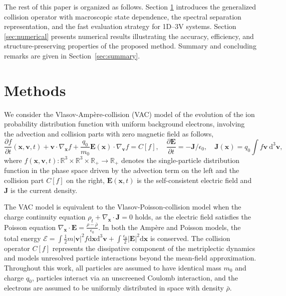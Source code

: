 \documentclass[preprint,1p,times]{elsarticle}
\theoremstyle{definition}
\theoremstyle{remark}
\begin{document}
The rest of this paper is organized as follows. 
Section \ref{sec:method} introduces the generalized collision operator with macroscopic state dependence, the spectral separation representation, and the fast evaluation strategy for 1D–3V systems. 
Section \ref{sec:numerical} presents numerical results illustrating the accuracy, efficiency, and structure-preserving properties of the proposed method. Summary and concluding remarks are given in Section~\ref{sec:summary}.




\section{Methods}\label{sec:method}

We consider the Vlasov-Amp\`ere-collision (VAC) model of the evolution of the ion probability distribution function with uniform background electrons, involving the advection and collision parts with zero magnetic field as follows,
\begin{equation}
    \dfrac{\partial f}{\partial t}(\bm{x},\bm{v},t) + \bm{v} \cdot \nabla_{\bm{x}} f + \dfrac{q_{0}}{m_{0}} \bm{E}(\bm{x}) \cdot \nabla_{\bm{v}} f  = C[f] , \quad \dfrac{\partial \bm{E}}{\partial t} = -\bm{J}/\epsilon_{0}, \quad \bm{J}(\bm{x}) = q_{0} \int f\bm{v} ~ \mathrm{d}^{3} \bm{v} ,
\end{equation}
where $f(\bm{x},\bm{v},t): \mathbb{R}^{3} \times \mathbb{R}^{3} \times \mathbb{R}_{+} \to \mathbb{R}_{+}$ denotes the single-particle distribution function in the phase space driven by the advection term on the left and the collision part $C[f]$ on the right, $\bm{E}(\bm{x},t)$ is the self-consistent electric field and $\bm{J}$ is the current density.

The VAC model is equivalent to the Vlasov-Poisson-collision model when the charge continuity equation $\rho_{t} + \nabla_{\bm{x}}\cdot \bm{J} = 0$ holds, as the electric field satisfies the Poisson equation $\nabla_{\bm{x}} \cdot \bm{E} = \frac{\rho - \bar{\rho}}{\epsilon_{0}}$.
In both the Amp\`ere and Poisson models, the total energy $\mathcal{E} = \int \frac{1}{2} m |\bm{v}|^{2} f \mathrm{d} \bm{x} \mathrm{d}^{3} \bm{v} + \int \frac{\epsilon_{0}}{2} |\bm{E}|^{2} \mathrm{d} \bm{x}$ is conserved.
The collision operator $C[f]$ represents the dissipative component of the metriplectic dynamics and models unresolved particle interactions beyond the mean-field approximation.
Throughout this work, all particles are assumed to have identical mass $m_{0}$ and charge $q_{0}$, particles interact via an unscreened Coulomb interaction, and the electrons are assumed to be uniformly distributed in space with density $\bar{\rho}$.
\end{document}

